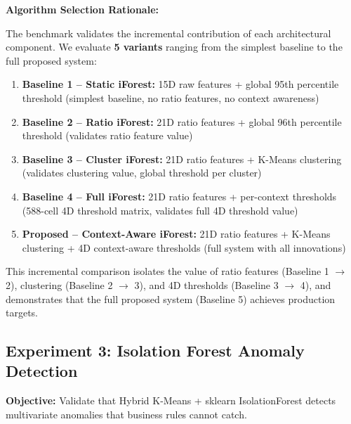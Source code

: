 \textbf{Algorithm Selection Rationale:}

The benchmark validates the incremental contribution of each architectural component. We evaluate \textbf{5 variants} ranging from the simplest baseline to the full proposed system:

\begin{enumerate}
    \item \textbf{Baseline 1 -- Static iForest:} 15D raw features + global 95th percentile threshold (simplest baseline, no ratio features, no context awareness)
    \item \textbf{Baseline 2 -- Ratio iForest:} 21D ratio features + global 96th percentile threshold (validates ratio feature value)
    \item \textbf{Baseline 3 -- Cluster iForest:} 21D ratio features + K-Means clustering (validates clustering value, global threshold per cluster)
    \item \textbf{Baseline 4 -- Full iForest:} 21D ratio features + per-context thresholds (588-cell 4D threshold matrix, validates full 4D threshold value)
    \item \textbf{Proposed -- Context-Aware iForest:} 21D ratio features + K-Means clustering + 4D context-aware thresholds (full system with all innovations)
\end{enumerate}

This incremental comparison isolates the value of ratio features (Baseline 1 $\to$ 2), clustering (Baseline 2 $\to$ 3), and 4D thresholds (Baseline 3 $\to$ 4), and demonstrates that the full proposed system (Baseline 5) achieves production targets.

\subsection{Experiment 3: Isolation Forest Anomaly Detection}

\textbf{Objective:} Validate that Hybrid K-Means + sklearn IsolationForest detects multivariate anomalies that business rules cannot catch.

